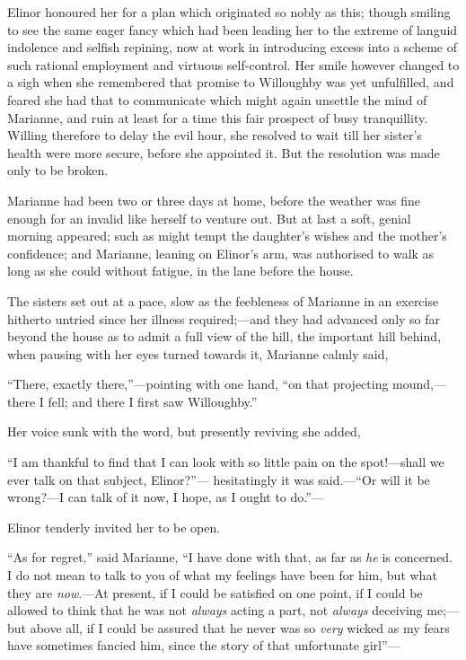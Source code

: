 \documentclass{article}
\begin{document}
Elinor honoured her for a plan which originated
so nobly as this; though smiling to see the same eager
fancy which had been leading her to the extreme of languid
indolence and selfish repining, now at work in introducing
excess into a scheme of such rational employment and virtuous
self-control. Her smile however changed to a sigh when she
remembered that promise to Willoughby was yet unfulfilled,
and feared she had that to communicate which might again
unsettle the mind of Marianne, and ruin at least for a time
this fair prospect of busy tranquillity.  Willing therefore
to delay the evil hour, she resolved to wait till her
sister's health were more secure, before she appointed it.
But the resolution was made only to be broken.

Marianne had been two or three days at home, before
the weather was fine enough for an invalid like herself
to venture out.  But at last a soft, genial morning appeared;
such as might tempt the daughter's wishes and the
mother's confidence; and Marianne, leaning on Elinor's arm,
was authorised to walk as long as she could without fatigue,
in the lane before the house.

The sisters set out at a pace, slow as the feebleness
of Marianne in an exercise hitherto untried since her
illness required;---and they had advanced only so far
beyond the house as to admit a full view of the hill,
the important hill behind, when pausing with her eyes
turned towards it, Marianne calmly said,

``There, exactly there,''---pointing with one hand,
``on that projecting mound,---there I fell; and there
I first saw Willoughby.''

Her voice sunk with the word, but presently reviving she added,

``I am thankful to find that I can look with so little pain
on the spot!---shall we ever talk on that subject, Elinor?''---%
hesitatingly it was said.---``Or will it be wrong?---I can talk
of it now, I hope, as I ought to do.''---%

Elinor tenderly invited her to be open.

``As for regret,'' said Marianne, ``I have done with that,
as far as \emph{he} is concerned.  I do not mean to talk to you
of what my feelings have been for him, but what they
are \emph{now}.---At present, if I could be satisfied on one point,
if I could be allowed to think that he was not \emph{always}
acting a part, not \emph{always} deceiving me;---but above all,
if I could be assured that he never was so \emph{very} wicked
as my fears have sometimes fancied him, since the story
of that unfortunate girl''---%
\end{document}
